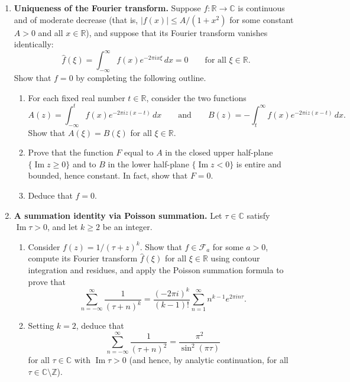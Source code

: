 \documentclass[12pt,reqno]{amsart}
\newcommand{\C}{\mathbb{C}}
\newcommand{\R}{\mathbb{R}}
\newcommand{\Z}{\mathbb{Z}}
\begin{document}
\begin{enumerate}
\item \textbf{Uniqueness of the Fourier transform.}
Suppose $f:\R\to\C$ is continuous and of moderate decrease (that is,
$|f(x)|\leq A/(1+x^2)$ for some constant $A>0$ and all $x\in\R$), and
suppose that its Fourier transform vanishes identically:
\[
 \widehat f(\xi)=\int_{-\infty}^{\infty}f(x)e^{-2\pi i x\xi}\,dx=0
 \qquad\text{for all }\xi\in\R.
\]
Show that $f=0$ by completing the following outline.
\begin{enumerate}
\item For each fixed real number $t\in\R$, consider the two functions
\[
 A(z)=\int_{-\infty}^{t} f(x)e^{-2\pi i z(x-t)}\,dx
 \qquad\text{and}\qquad
 B(z)=-\int_{t}^{\infty} f(x)e^{-2\pi i z(x-t)}\,dx.
\]
Show that $A(\xi)=B(\xi)$ for all $\xi\in\R$.
\item Prove that the function $F$ equal to $A$ in the closed upper
half-plane $\{\operatorname{Im}z\geq 0\}$ and to $B$ in the lower
half-plane $\{\operatorname{Im}z<0\}$ is entire and bounded, hence
constant. In fact, show that $F=0$.
\item Deduce that $f=0$.
\end{enumerate}


\item \textbf{A summation identity via Poisson summation.}
Let $\tau\in\C$ satisfy $\operatorname{Im}\tau>0$, and let $k\geq 2$ be
an integer.
\begin{enumerate}
\item Consider $f(z)=1/(\tau+z)^k$. Show that $f\in\mathcal{F}_a$
for some $a>0$, compute its Fourier transform $\widehat f(\xi)$ for all
$\xi\in\R$ using contour integration and residues, and apply the Poisson
summation formula to prove that
\[
 \sum_{n=-\infty}^{\infty}\frac{1}{(\tau+n)^k}
 =\frac{(-2\pi i)^k}{(k-1)!}\sum_{n=1}^{\infty} n^{k-1} e^{2\pi i n\tau}.
\]
\item Setting $k=2$, deduce that
\[
 \sum_{n=-\infty}^{\infty}\frac{1}{(\tau+n)^2}
 =\frac{\pi^2}{\sin^2(\pi\tau)}
\]
for all $\tau\in\C$ with $\operatorname{Im}\tau>0$ (and hence, by
analytic continuation, for all $\tau\in\C\setminus\Z$).
\end{enumerate}

\end{enumerate}
\end{document}
